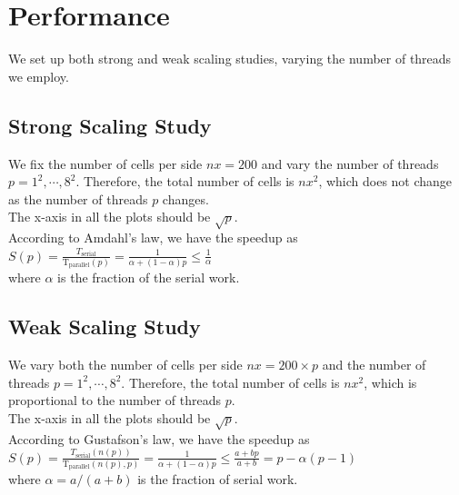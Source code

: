 \documentclass[12pt]{article}
\numberwithin{equation}{section}
\begin{document}
\section{Performance}

\normalsize
We set up both strong and weak scaling studies, varying the number of threads we employ.

\subsection{Strong Scaling Study}

We fix the number of cells per side $nx = 200$ and vary the number of threads $p = 1^2, \cdots, 8^2$. Therefore, the total number of cells is $nx^2$, which does not change as the number of threads $p$ changes.
\\
The x-axis in all the plots should be $\sqrt{p}$.
\\
According to Amdahl's law, we have the speedup as
\\
$S(p) = \frac{T_\textrm{serial}}{\textrm{T}_\textrm{parallel}(p)} = \frac{1}{\alpha + (1-\alpha)p} \leq \frac{1}{\alpha}$
\\
where $\alpha$ is the fraction of the serial work.

\subsection{Weak Scaling Study}

We vary both the number of cells per side $nx = 200 \times p$ and the number of threads $p = 1^2, \cdots, 8^2$. Therefore, the total number of cells is $nx^2$, which is proportional to the number of threads $p$.
\\
The x-axis in all the plots should be $\sqrt{p}$.
\\
According to Gustafson's law, we have the speedup as
\\
$S(p) = \frac{T_\textrm{serial}(n(p))}{\textrm{T}_\textrm{parallel}(n(p), p)} = \frac{1}{\alpha + (1-\alpha)p} \leq \frac{a + bp}{a + b} = p - \alpha(p-1)$
\\
where $\alpha=a/(a+b)$ is the fraction of serial work.
\end{document}
